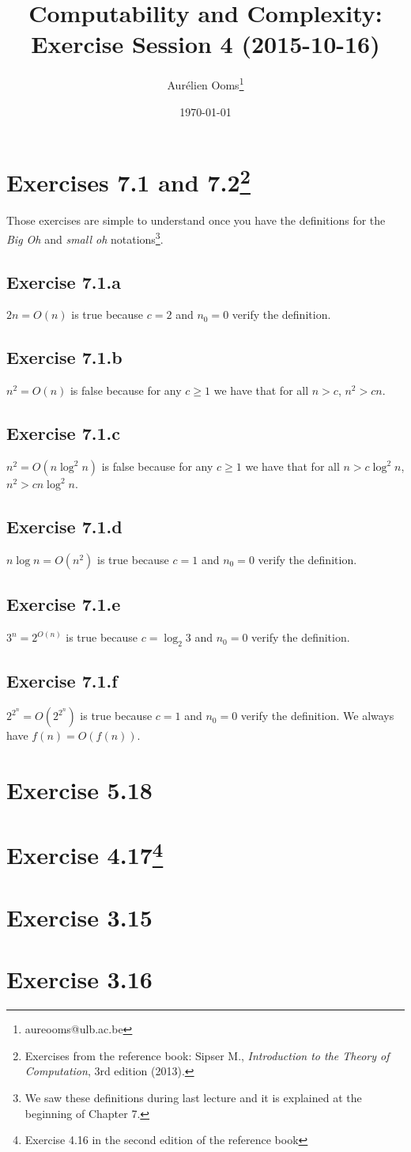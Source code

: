 \documentclass{article}
\title{Computability and Complexity:\\Exercise Session 4 (2015-10-16)}
\author{Aurélien Ooms\footnote{aureooms@ulb.ac.be}}
\date{\today}
\begin{document}
\maketitle
\tableofcontents

\section{Exercises 7.1 and 7.2\footnote{Exercises from the reference book: Sipser M.,
\emph{Introduction to the Theory of Computation}, 3rd edition (2013).}}
Those exercises are simple to understand once you have the definitions for the
\emph{Big Oh} and \emph{small oh} notations\footnote{We saw these definitions
during last lecture and it is explained at the beginning of Chapter 7.}.

\subsection{Exercise 7.1.a}
\(2n = O(n)\)
is true because \(c = 2\) and \(n_0 = 0\) verify the definition.

\subsection{Exercise 7.1.b}
\(n^2 = O(n)\)
is false because for any \(c \ge 1\) we have that for all \(n > c\), \(n^2 > cn\).

\subsection{Exercise 7.1.c}
\(n^2 = O(n \log^2 n)\)
is false because for any \(c \ge 1\) we have that for all \(n > c \log^2 n\), \(n^2 > cn \log^2 n\).

\subsection{Exercise 7.1.d}
\(n \log n = O(n^2)\)
is true because \(c = 1\) and \(n_0 = 0\) verify the definition.

\subsection{Exercise 7.1.e}
\(3^n = 2^{O(n)}\)
is true because \(c = \log_2 3\) and \(n_0 = 0\) verify the definition.

\subsection{Exercise 7.1.f}
\(2^{2^n} = O(2^{2^n})\)
is true because \(c = 1\) and \(n_0 = 0\) verify the definition. We always have
\(f(n) = O(f(n))\).

\section{Exercise 5.18}

\section{Exercise 4.17\footnote{Exercise 4.16 in the second edition of the
reference book}}

\section{Exercise 3.15}
\section{Exercise 3.16}
\end{document}
